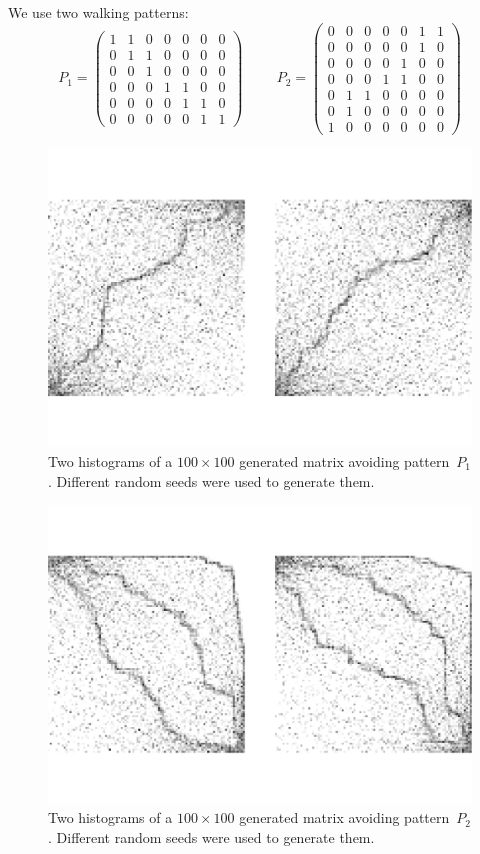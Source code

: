 We use two walking patterns:
$$P_1=\left(\begin{array}{ccccccc}
1 & 1 & 0 & 0 & 0 & 0 & 0 \\
0 & 1 & 1 & 0 & 0 & 0 & 0 \\
0 & 0 & 1 & 0 & 0 & 0 & 0 \\
0 & 0 & 0 & 1 & 1 & 0 & 0 \\
0 & 0 & 0 & 0 & 1 & 1 & 0 \\
0 & 0 & 0 & 0 & 0 & 1 & 1
\end{array}\right)\hspace{1cm}
P_2=\left(\begin{array}{ccccccc}
0 & 0 & 0 & 0 & 0 & 1 & 1 \\
0 & 0 & 0 & 0 & 0 & 1 & 0 \\
0 & 0 & 0 & 0 & 1 & 0 & 0 \\
0 & 0 & 0 & 1 & 1 & 0 & 0 \\
0 & 1 & 1 & 0 & 0 & 0 & 0 \\
0 & 1 & 0 & 0 & 0 & 0 & 0 \\
1 & 0 & 0 & 0 & 0 & 0 & 0
\end{array}\right)$$
\begin{figure}[h!]
\centering
\includegraphics[width=120mm]{../img/walker.pdf}
\caption{Two histograms of a $100\times100$ generated matrix avoiding pattern~$P_1$. Different random seeds were used to generate them.}
\label{walker}
\end{figure}

\begin{figure}[h!]
\centering
\includegraphics[width=120mm]{../img/walker2.pdf}
\caption{Two histograms of a $100\times100$ generated matrix avoiding pattern~$P_2$. Different random seeds were used to generate them.}
\label{walker2}
\end{figure}